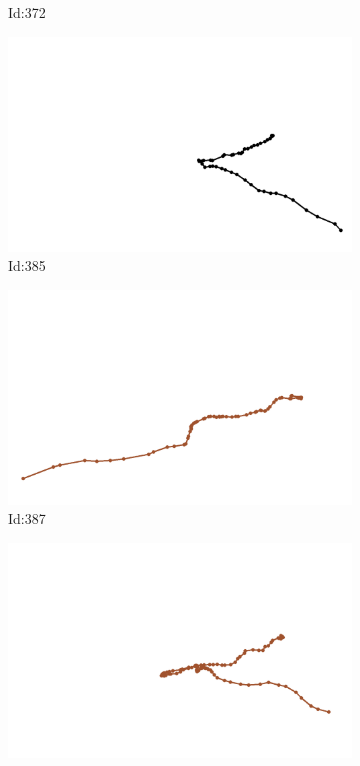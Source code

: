 \documentclass[12pt,twoside]{report}
\begin{document}
\begin{figure}
\begin{subfigure}[b]{0.20\textwidth}
\caption{Id:372}
\end{subfigure}
\begin{subfigure}[b]{0.20\textwidth}
\centering
\includegraphics[width=\textwidth]{../trajectories/385.png}
\caption{Id:385}
\end{subfigure}
\begin{subfigure}[b]{0.20\textwidth}
\centering
\includegraphics[width=\textwidth]{../trajectories/387.png}
\caption{Id:387}
\end{subfigure}
\begin{subfigure}[b]{0.20\textwidth}
\centering
\includegraphics[width=\textwidth]{../trajectories/394.png}

\end{subfigure}
\end{figure}
\end{document}
